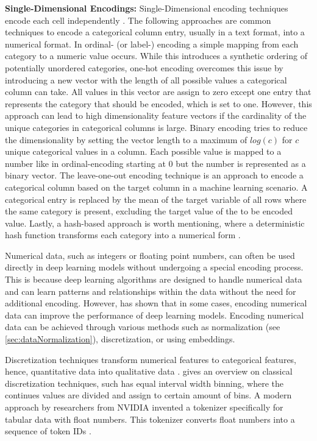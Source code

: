 \textbf{Single-Dimensional Encodings:}
Single-Dimensional encoding techniques encode each cell independently \cite{borisov2022DeepNeuralNetworks}.
The following approaches are common techniques to encode a categorical column entry, usually in a text format, into a numerical format.
In ordinal- (or label-) encoding a simple mapping from each category to a numeric value occurs. 
While this introduces a synthetic ordering of potentially unordered categories, one-hot encoding overcomes this issue by introducing a new vector with the length of all possible values a categorical column can take.
All values in this vector are assign to zero except one entry that represents the category that should be encoded, which is set to one.
However, this approach can lead to high dimensionality feature vectors if the cardinality of the unique categories in categorical columns is large.
Binary encoding tries to reduce the dimensionality by setting the vector length to a maximum of $log(c)$ for $c$ unique categorical values in a column.
Each possible value is mapped to a number like in ordinal-encoding starting at 0 but the number is represented as a binary vector.
The leave-one-out encoding technique is an approach to encode a categorical column based on the target column in a machine learning scenario. 
A categorical entry is replaced by the mean of the target variable of all rows where the same category is present, excluding the target value of the to be encoded value.
Lastly, a hash-based approach is worth mentioning, where a deterministic hash function transforms each category into a numerical form \cite{borisov2022DeepNeuralNetworks}.

Numerical data, such as integers or floating point numbers, can often be used directly in deep learning \glspl{model} without undergoing a special encoding process. 
This is because deep learning algorithms are designed to handle numerical data and can learn patterns and relationships within the data without the need for additional encoding.
However, \cite{gorishniy2022EmbeddingsNumericalFeatures} has shown that in some cases, encoding numerical data can improve the performance of deep learning \glspl{model}. 
Encoding numerical data can be achieved through various methods such as normalization (see \autoref{sec:dataNormalization}), discretization, or using embeddings.

Discretization techniques transform numerical features to categorical features, hence, quantitative data into qualitative data \cite{garcia2016BigDataPreprocessing}. 
\cite{dougherty1995SupervisedUnsupervisedDiscretization} gives an overview on classical discretization techniques, such has equal interval width binning, where the continues values are divided and assign to certain amount of bins.
A modern approach by researchers from NVIDIA \cite{dong2022GeneratingSyntheticData} invented a tokenizer specifically for tabular data with float numbers. 
This tokenizer converts float numbers into a sequence of token IDs \cite{dong2022GeneratingSyntheticData}.

